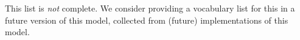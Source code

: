 This list is \emph{not} complete. We consider providing a vocabulary list for this 
in a future version of this model, collected from (future) implementations of this model.




